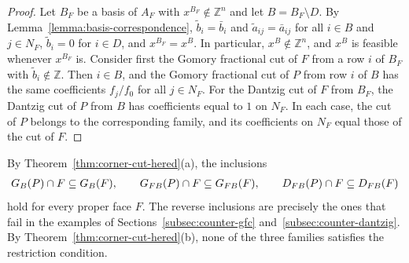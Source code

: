 \documentclass{article}
\newcommand{\Z}{\mathbb{Z}}
\newcommand{\R}{\mathbb{R}}
\newcommand{\Q}{\mathbb{Q}}
\begin{document}
\begin{proof}
    Let $B_F$ be a basis of $A_F$ with $x^{B_F} \notin \Z^n$ and let $B = B_F \setminus D$. By Lemma~\ref{lemma:basis-correspondence}, $\tilde b_i = \bar b_i$ and $\tilde a_{ij} = \bar a_{ij}$ for all $i \in B$ and $j \in N_F$, $\tilde b_i = 0$ for $i \in D$, and $x^{B_F} = x^B$. In particular, $x^B \notin \Z^n$, and $x^B$ is feasible whenever $x^{B_F}$ is. Consider first the Gomory fractional cut of $F$ from a row $i$ of $B_F$ with $\tilde b_i \notin \Z$. Then $i \in B$, and the Gomory fractional cut of $P$ from row $i$ of $B$ has the same coefficients $f_j/f_0$ for all $j \in N_F$. For the Dantzig cut of $F$ from $B_F$, the Dantzig cut of $P$ from $B$ has coefficients equal to $1$ on $N_F$. In each case, the cut of $P$ belongs to the corresponding family, and its coefficients on $N_F$ equal those of the cut of $F$.
\end{proof}

By Theorem~\ref{thm:corner-cut-hered}(a), the inclusions 
\begin{align}
    G_{B}(P) \cap F \subseteq G_{B}(F), \qquad G_{FB}(P) \cap F \subseteq G_{FB}(F), \qquad D_{FB}(P) \cap F \subseteq D_{FB}(F) \notag
\end{align}
hold for every proper face $F$. The reverse inclusions are precisely the ones that fail in the examples of Sections~\ref{subsec:counter-gfc} and~\ref{subsec:counter-dantzig}. By Theorem~\ref{thm:corner-cut-hered}(b), none of the three families satisfies the restriction condition.



\end{document}
